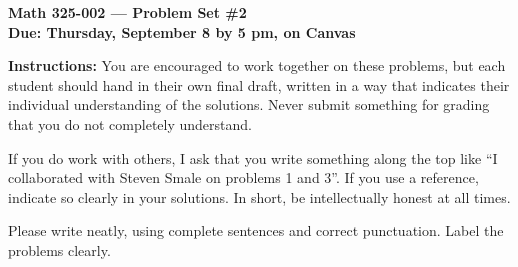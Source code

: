 \documentclass{amsart}
\begin{document}
\begin{center}
{\large\bfseries
Math 325-002 --- Problem Set \#2 \\
Due: Thursday, September 8 by 5 pm, on Canvas}
\end{center}





{\bf Instructions:} You are encouraged to work together on these
problems, but each student should hand in their own final draft,
written in a way that indicates their individual understanding of
the solutions. Never submit something for grading
that you do not completely understand. 

If you do work with others, I ask that you write something along the
top like ``I collaborated with Steven Smale on problems 1 and 3''.
If you use a reference, indicate so clearly in your solutions. 
In short, be intellectually
honest at all times.

Please write neatly, using complete sentences and correct
punctuation. Label the problems clearly. 
\end{document}
